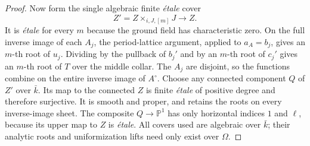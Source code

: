 \begin{proof}
Now form the single algebraic finite \emph{\'etale} cover
\[
                    Z'=Z\times_{i,J,[m]}J\longrightarrow Z.
\]
It is \emph{\'etale} for every $m$ because the ground field
has characteristic zero. On the full inverse image of each
$A_j$, the period-lattice argument, applied to $a_A=b_j$,
gives an $m$-th root of $u_j$. Dividing by the pullback of
$b_j'$ and by an $m$-th root of $c_j'$ gives an $m$-th root
of $T$ over the middle collar. The $A_j$ are disjoint, so the
functions combine on the entire inverse image of $A^\circ$.
Choose any connected component $Q$ of $Z'$ over $\bar k$.
Its map to the connected $Z$ is finite \emph{\'etale} of
positive degree and therefore surjective. It is smooth and
proper, and retains the roots on every inverse-image sheet.
The composite $Q\to\mathbb P^1$ has only horizontal indices
$1$ and $\ell$, because its upper map to $Z$ is \emph{\'etale}.
All covers used are algebraic over $\bar k$; their analytic
roots and uniformization lifts need only exist over $\Omega$.
\end{proof}

